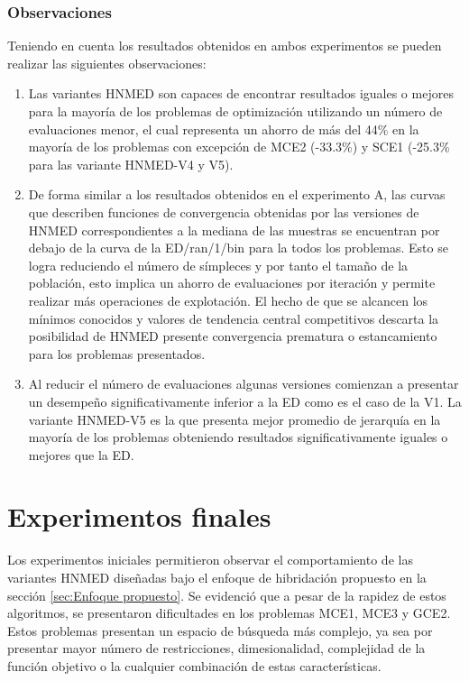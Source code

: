 \subsubsection{Observaciones}
Teniendo en cuenta los resultados obtenidos en ambos experimentos se pueden realizar las siguientes observaciones:
\begin{enumerate}
	\item Las variantes HNMED son capaces de encontrar resultados iguales o mejores para la mayoría de los problemas de optimización utilizando un número de evaluaciones menor, el cual representa un ahorro de más del 44\% en la mayoría de los problemas con excepción de MCE2 (-33.3\%) y SCE1 (-25.3\% para las variante HNMED-V4 y V5).      
	\item De forma similar a los resultados obtenidos en el experimento A, las curvas que describen funciones de convergencia obtenidas por las versiones de HNMED correspondientes a la mediana de las muestras se encuentran por debajo de la curva de la ED/ran/1/bin para la todos los problemas. Esto se logra reduciendo el número de símpleces y por tanto el tamaño de la población, esto implica un ahorro de evaluaciones por iteración y  permite realizar más operaciones de explotación. El hecho de que se alcancen los mínimos conocidos y valores de tendencia central competitivos descarta la posibilidad de HNMED presente convergencia prematura o estancamiento para los problemas presentados. 
	\item Al reducir el número de evaluaciones algunas versiones comienzan a presentar un desempeño significativamente inferior a la ED como es el caso de la V1. La variante HNMED-V5 es la que presenta mejor promedio de jerarquía en la mayoría de los problemas obteniendo resultados significativamente iguales o mejores que la ED.
\end{enumerate}




\section{Experimentos finales}
Los experimentos iniciales permitieron observar el comportamiento de las variantes HNMED diseñadas bajo el enfoque de hibridación propuesto en la sección \ref{sec:Enfoque propuesto}. Se evidenció que a pesar de la rapidez de estos algoritmos, se presentaron dificultades en los problemas MCE1, MCE3 y GCE2. Estos problemas presentan un espacio de búsqueda más complejo, ya sea por presentar mayor número de restricciones, dimesionalidad, complejidad de la función objetivo o la cualquier combinación de estas características. 

